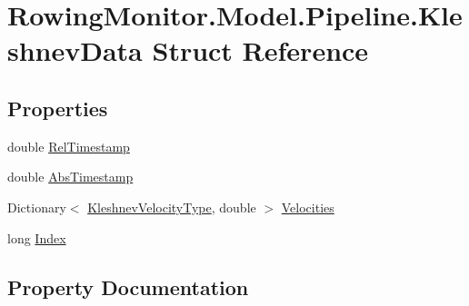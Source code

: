 \hypertarget{struct_rowing_monitor_1_1_model_1_1_pipeline_1_1_kleshnev_data}{}\section{Rowing\+Monitor.\+Model.\+Pipeline.\+Kleshnev\+Data Struct Reference}
\label{struct_rowing_monitor_1_1_model_1_1_pipeline_1_1_kleshnev_data}
\subsection*{Properties}
\begin{DoxyCompactItemize}
\item 
double \hyperlink{struct_rowing_monitor_1_1_model_1_1_pipeline_1_1_kleshnev_data_ab0f0ba7b2c4c9ec7248fca81c9a5f482}{Rel\+Timestamp}
\item 
double \hyperlink{struct_rowing_monitor_1_1_model_1_1_pipeline_1_1_kleshnev_data_ad59fa89e9efe861ab2c0afd23297a62a}{Abs\+Timestamp}
\item 
Dictionary$<$ \hyperlink{namespace_rowing_monitor_1_1_model_1_1_util_a45e0956b123d438555a1cb3997bd5cb4}{Kleshnev\+Velocity\+Type}, double $>$ \hyperlink{struct_rowing_monitor_1_1_model_1_1_pipeline_1_1_kleshnev_data_a62142432ba1620e06b133e9119b33493}{Velocities}
\item 
long \hyperlink{struct_rowing_monitor_1_1_model_1_1_pipeline_1_1_kleshnev_data_a1b21f8ca17372b1da98a8f0126c5bcf2}{Index}
\end{DoxyCompactItemize}


\subsection{Property Documentation}
\mbox{\label{struct_rowing_monitor_1_1_model_1_1_pipeline_1_1_kleshnev_data_ad59fa89e9efe861ab2c0afd23297a62a}} 
